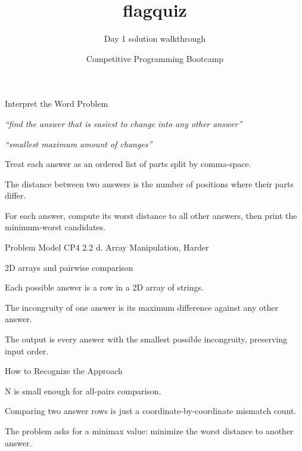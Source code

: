 \documentclass[aspectratio=169,11pt]{beamer}
\title[flagquiz]{flagquiz}
\subtitle{Day 1 solution walkthrough}
\author[Solution Deck]{Competitive Programming Bootcamp}
\date{}
\begin{document}
\begin{frame}[plain]
  \titlepage
\end{frame}

\begin{frame}{Interpret the Word Problem}
\small
{}
\begin{tightitemize}
  \item \textit{``find the answer that is easiest to change into any other answer''}
  \item \textit{``smallest maximum amount of changes''}
\end{tightitemize}

\vspace{0.18cm}
\begin{tightitemize}
  \item Treat each answer as an ordered list of parts split by comma-space.
  \item The distance between two answers is the number of positions where their parts differ.
  \item For each answer, compute its worst distance to all other answers, then print the minimum-worst candidates.
\end{tightitemize}
\end{frame}







\begin{frame}{Problem Model}
\small
{} CP4 2.2 d. Array Manipulation, Harder

\vspace{0.25cm}
 2D arrays and pairwise comparison

\vspace{0.25cm}
\begin{tightitemize}
  \item Each possible answer is a row in a 2D array of strings.
  \item The incongruity of one answer is its maximum difference against any other answer.
  \item The output is every answer with the smallest possible incongruity, preserving input order.
\end{tightitemize}
\end{frame}

\begin{frame}{How to Recognize the Approach}
\begin{tightitemize}
  \item N is small enough for all-pairs comparison.
  \item Comparing two answer rows is just a coordinate-by-coordinate mismatch count.
  \item The problem asks for a minimax value: minimize the worst distance to another answer.
\end{tightitemize}
\end{frame}
\end{document}
